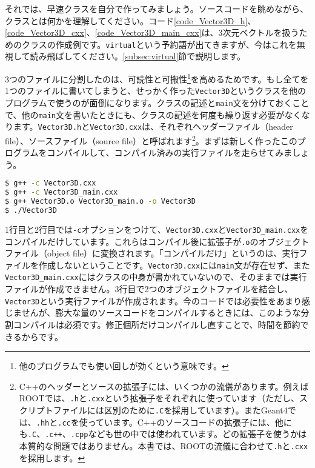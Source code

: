 それでは、早速クラスを自分で作ってみましょう。ソースコードを眺めながら、クラスとは何かを理解してください。コード\ref{code_Vector3D_h}、\ref{code_Vector3D_cxx}、\ref{code_Vector3D_main_cxx}は、3次元ベクトルを扱うためのクラスの作成例です。\texttt{virtual}という予約語が出てきますが、今はこれを無視して読み飛ばしてください。\ref{subsec:virtual}節で説明します。

\begin{NoFloat}

\end{NoFloat}
\begin{NoFloat}

\end{NoFloat}
\begin{NoFloat}

\end{NoFloat}

3つのファイルに分割したのは、可読性と可搬性\footnote{他のプログラムでも使い回しが効くという意味です。}を高めるためです。もし全てを1つのファイルに書いてしまうと、せっかく作った\texttt{Vector3D}というクラスを他のプログラムで使うのが面倒になります。クラスの記述と\texttt{main}文を分けておくことで、他の\texttt{main}文を書いたときにも、クラスの記述を何度も繰り返す必要がなくなります。\texttt{Vector3D.h}と\texttt{Vector3D.cxx}は、それぞれヘッダーファイル（header file）、ソースファイル（source file）と呼ばれます\footnote{C++のヘッダーとソースの拡張子には、いくつかの流儀があります。例えばROOTでは、\texttt{.h}と\texttt{.cxx}という拡張子をそれぞれに使っています（ただし、スクリプトファイルには区別のために\texttt{.C}を採用しています）。またGeant4では、\texttt{.hh}と\texttt{.cc}を使っています。C++のソースコードの拡張子には、他にも\texttt{.C}、\texttt{.c++}、\texttt{.cpp}なども世の中では使われています。どの拡張子を使うかは本質的な問題ではありません。本書では、ROOTの流儀に合わせて\texttt{.h}と\texttt{.cxx}を採用します。}。まずは新しく作ったこのプログラムをコンパイルして、コンパイル済みの実行ファイルを走らせてみましょう。
\begin{lstlisting}[language=bash]
$ g++ -c Vector3D.cxx
$ g++ -c Vector3D_main.cxx
$ g++ Vector3D.o Vector3D_main.o -o Vector3D
$ ./Vector3D
\end{lstlisting}
1行目と2行目では\texttt{-c}オプションをつけて、\texttt{Vector3D.cxx}と\texttt{Vector3D\_main.cxx}をコンパイルだけしています。これらはコンパイル後に拡張子が\texttt{.o}のオブジェクトファイル（object file）に変換されます。「コンパイルだけ」というのは、実行ファイルを作成しないということです。\texttt{Vector3D.cxx}には\texttt{main}文が存在せず、また\texttt{Vector3D\_main.cxx}にはクラスの中身が書かれていないので、そのままでは実行ファイルが作成できません。3行目で2つのオブジェクトファイルを結合し、\texttt{Vector3D}という実行ファイルが作成されます。今のコードでは必要性をあまり感じませんが、膨大な量のソースコードをコンパイルするときには、このような分割コンパイルは必須です。修正個所だけコンパイルし直すことで、時間を節約できるからです。

